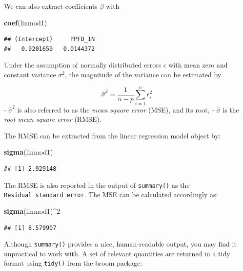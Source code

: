 \documentclass[
]{book}
\newenvironment{Shaded}{\begin{snugshade}}{\end{snugshade}}
\newcommand{\DecValTok}[1]{\textcolor[rgb]{0.00,0.00,0.81}{#1}}
\newcommand{\KeywordTok}[1]{\textcolor[rgb]{0.13,0.29,0.53}{\textbf{#1}}}
\newcommand{\NormalTok}[1]{#1}
\newcommand{\OperatorTok}[1]{\textcolor[rgb]{0.81,0.36,0.00}{\textbf{#1}}}
\begin{document}
We can also extract coefficients \(\beta\) with

\begin{Shaded}
\begin{Highlighting}[]
\KeywordTok{coef}\NormalTok{(linmod1)}
\end{Highlighting}
\end{Shaded}

\begin{verbatim}
## (Intercept)     PPFD_IN 
##   0.9201659   0.0144372
\end{verbatim}

Under the assumption of normally distributed errors \(\epsilon\) with mean zero and constant variance \(\sigma^2\), the magnitude of the variance can be estimated by

\[
\widehat{\sigma}^2 = \frac{1}{n-p} \sum_{i=1}^n \epsilon_i^2
\]
- \(\widehat{\sigma}^2\) is also referred to as the \emph{mean square error} (MSE), and its root,
- \(\widehat{\sigma}\) is the \emph{root mean square error} (RMSE).

The RMSE can be extracted from the linear regression model object by:

\begin{Shaded}
\begin{Highlighting}[]
\KeywordTok{sigma}\NormalTok{(linmod1)}
\end{Highlighting}
\end{Shaded}

\begin{verbatim}
## [1] 2.929148
\end{verbatim}

The RMSE is also reported in the output of \texttt{summary()} as the \texttt{Residual\ standard\ error}. The MSE can be calculated accordingly as:

\begin{Shaded}
\begin{Highlighting}[]
\KeywordTok{sigma}\NormalTok{(linmod1)}\OperatorTok{^}\DecValTok{2}
\end{Highlighting}
\end{Shaded}

\begin{verbatim}
## [1] 8.579907
\end{verbatim}

Although \texttt{summary()} provides a nice, human-readable output, you may find it unpractical to work with. A set of relevant quantities are returned in a tidy format using \texttt{tidy()} from the broom package:
\end{document}
